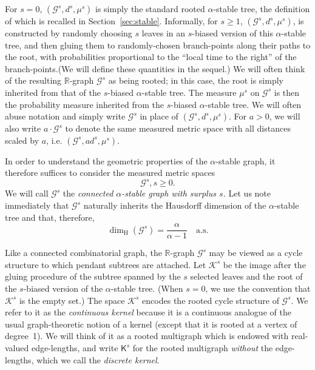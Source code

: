 \documentclass[AHL,Unicode,longabstracts,published]{cedram}
\newcommand{\rmH}{\mathrm{H}}
\newcommand{\cG}{\mathcal{G}}
\newcommand{\cK}{\mathcal{K}}
\newcommand{\sK}{\mathsf{K}}
\newcommand{\R}{\mathbb{R}}
\newcommand{\R}{\mathbb{R}}
\begin{document}
For $s=0$, $(\cG^s,d^s, \mu^s)$ is simply the standard rooted $\alpha$-stable tree, the definition of which is recalled in Section~\ref{sec:stable}. Informally, for $s \ge 1$, $(\cG^s,d^s, \mu^s)$, is constructed by randomly choosing $s$ leaves in an $s$-biased version of this $\alpha$-stable tree, and then gluing them to randomly-chosen branch-points along their paths to the root, with probabilities proportional to the ``local time to the right'' of the branch-points.\linebreak(We will define these quantities in the sequel.) We will often think of the resulting $\R$-graph $\cG^s$ as being rooted; in this case, the root is simply inherited from that of the $s$-biased $\alpha$-stable tree. The measure $\mu^s$ on $\cG^s$ is then the probability measure inherited from the $s$-biased $\alpha$-stable tree. We will often abuse notation and simply write $\cG^s$ in place of $(\cG^s, d^s, \mu^s)$. For $a > 0$, we will also write $a \cdot \cG^s$ to denote the same measured metric space with all distances scaled by $a$, i.e. $(\cG^s, a d^s, \mu^s)$.

In order to understand the geometric properties of the $\alpha$-stable graph, it therefore suffices to consider the measured metric spaces
\[
\cG^s, s \ge 0.
\]
We will call $\cG^s$ the \emph{connected $\alpha$-stable graph with surplus $s$.} Let us note immediately that $\cG^s$ naturally inherits the Hausdorff dimension of the $\alpha$-stable tree and that, therefore,
\[
\dim_{\rmH}(\cG^s)=\frac{\alpha}{\alpha-1} \quad \text{a.s.}
\]

Like a connected combinatorial graph, the $\R$-graph $\cG^s$ may be viewed as a cycle structure to which pendant subtrees are attached. Let $\cK^s$ be the image after the gluing procedure of the subtree spanned by the $s$ selected leaves and the root of the $s$-biased version of the $\alpha$-stable tree. (When $s=0$, we use the convention that $\cK^s$ is the empty set.) The space $\cK^s$ encodes the rooted cycle structure of $\cG^s$. We refer to it as the \emph{continuous kernel} because it is a continuous analogue of the usual graph-theoretic notion of a kernel (except that it is rooted at a vertex of degree~1). We will think of it as a rooted multigraph which is endowed with real-valued edge-lengths, and write $\sK^s$ for the rooted multigraph \emph{without} the edge-lengths, which we call the \emph{discrete kernel}.
\end{document}
